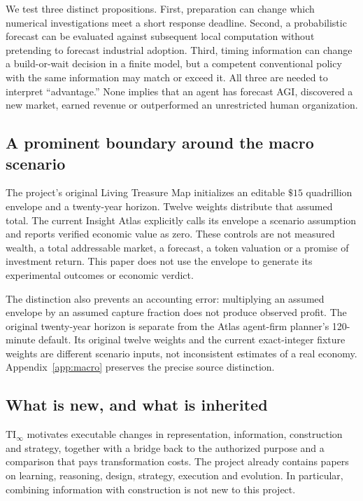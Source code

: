 \documentclass[11pt,a4paper]{article}
\newcommand{\TI}{\ensuremath{\mathrm{TI}_{\infty}}}
\begin{document}
We test three distinct propositions. First, preparation can change which numerical investigations meet a short response deadline. Second, a probabilistic forecast can be evaluated against subsequent local computation without pretending to forecast industrial adoption. Third, timing information can change a build-or-wait decision in a finite model, but a competent conventional policy with the same information may match or exceed it. All three are needed to interpret ``advantage.'' None implies that an agent has forecast AGI, discovered a new market, earned revenue or outperformed an unrestricted human organization.

\subsection{A prominent boundary around the macro scenario}
\begin{claimbox}[title={\sffamily Assumption panel: the $\$15$ quadrillion envelope}]
The project's original Living Treasure Map initializes an editable $\$15$ quadrillion envelope and a twenty-year horizon. Twelve weights distribute that assumed total. The current Insight Atlas explicitly calls its envelope a scenario assumption and reports verified economic value as zero. These controls are not measured wealth, a total addressable market, a forecast, a token valuation or a promise of investment return. This paper does not use the envelope to generate its experimental outcomes or economic verdict. \citep{atlas2026,treasure2026}
\end{claimbox}

The distinction also prevents an accounting error: multiplying an assumed envelope by an assumed capture fraction does not produce observed profit. The original twenty-year horizon is separate from the Atlas agent-firm planner's 120-minute default. Its original twelve weights and the current exact-integer fixture weights are different scenario inputs, not inconsistent estimates of a real economy. Appendix~\ref{app:macro} preserves the precise source distinction.

\subsection{What is new, and what is inherited}
\TI{} motivates executable changes in representation, information, construction and strategy, together with a bridge back to the authorized purpose and a comparison that pays transformation costs. The project already contains papers on learning, reasoning, design, strategy, execution and evolution. In particular, combining information with construction is not new to this project. \citep{ti2026,outlearn2026,outstrategise2026,outexecute2026}
\end{document}
